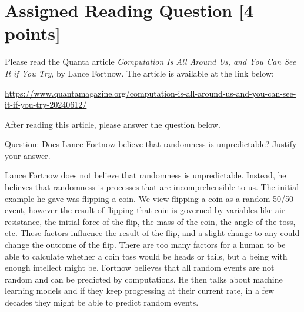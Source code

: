 \newpage
\section{Assigned Reading Question [4 points]}
Please read the Quanta article \emph{Computation Is All Around Us, and You Can See It if You Try}, by Lance Fortnow.  The article is available at the link below:
\begin{center}
{\small\href{https://www.quantamagazine.org/computation-is-all-around-us-and-you-can-see-it-if-you-try-20240612/}{https://www.quantamagazine.org/computation-is-all-around-us-and-you-can-see-it-if-you-try-20240612/}}
\end{center}
After reading this article, please answer the question below.

\medskip

\noindent\underline{Question:}
Does Lance Fortnow believe that randomness is unpredictable?  Justify your answer.

\medskip

Lance Fortnow does not believe that randomness is unpredictable. Instead, he believes 
that randomness is processes that are incomprehensible to us. The initial example he gave 
was flipping a coin. We view flipping a coin as a random 50/50 event, however the result 
of flipping that coin is governed by variables like air resistance, the initial force of 
the flip, the mass of the coin, the angle of the toss, etc. These factors influence the 
result of the flip, and a slight change to any could change the outcome of the flip. 
There are too many factors for a human to be able to calculate whether a coin toss would 
be heads or tails, but a being with enough intellect might be. Fortnow believes that all 
random events are not random and can be predicted by computations. He then talks about 
machine learning models and if they keep progressing at their current rate, in a few 
decades they might be able to predict random events.
